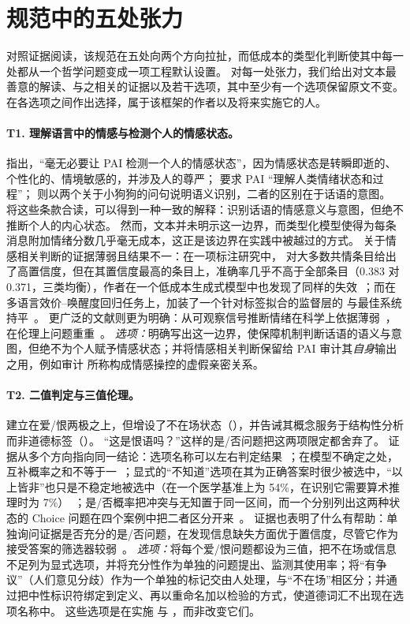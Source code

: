 \section{规范中的五处张力}
\label{sec:synthesis}

对照证据阅读，该规范在五处向两个方向拉扯，而低成本的类型化判断使其中每一处都从一个哲学问题变成一项工程默认设置。
对每一处张力，我们给出对文本最善意的解读、与之相关的证据以及若干选项，其中至少有一个选项保留原文不变。
在各选项之间作出选择，属于该框架的作者以及将来实施它的人。

\paragraph{T1. 理解语言中的情感与检测个人的情感状态。}
 指出，“毫无必要让 PAI 检测一个人的情感状态”，因为情感状态是转瞬即逝的、个性化的、情境敏感的，并涉及人的尊严； 要求 PAI “理解人类情绪状态和过程”； 则以两个关于小狗狗的问句说明语义识别，二者的区别在于话语的意图。
将这些条款合读，可以得到一种一致的解释：识别话语的情感意义与意图，但绝不推断个人的内心状态。
然而，文本并未明示这一边界，而类型化模型使得为每条消息附加情绪分数几乎毫无成本，这正是该边界在实践中被越过的方式。
关于情感相关判断的证据薄弱且结果不一：在一项标注研究中，\jev{} 对大多数共情条目给出了高置信度，但在其置信度最高的条目上，准确率几乎不高于全部条目（0.383 对 0.371，三类均衡），作者在一个低成本生成式模型中也发现了同样的失效~\cite{arx24574}；而在多语言效价--唤醒度回归任务上，加装了一个针对标签拟合的监督层的 \jev{} 与最佳系统持平~\cite{arx35293}。
更广泛的文献则更为明确：从可观察信号推断情绪在科学上依据薄弱~\cite{barrett2019emotional}，在伦理上问题重重~\cite{stark2021ethics}。
\emph{选项：}明确写出这一边界，使保障机制判断话语的语义与意图，但绝不为个人赋予情感状态；并将情感相关判断保留给 PAI 审计其\emph{自身}输出之用，例如审计  所称构成情感操控的虚假亲密关系。

\paragraph{T2. 二值判定与三值伦理。}
\pol{} 建立在爱/恨两极之上，但增设了不在场状态（），并告诫其概念服务于结构性分析而非道德标签（）。
“这是恨语吗？”这样的是/否问题把这两项限定都舍弃了。
证据从多个方向指向同一结论：选项名称可以左右判定结果~\cite{arx26758,arx00346}；在模型不确定之处，互补概率之和不等于一~\cite{arx33209}；显式的“不知道”选项在其为正确答案时很少被选中，“以上皆非”也只是不稳定地被选中（在一个医学基准上为 54\%，在识别它需要算术推理时为 7\%）~\cite{arx34024,arx39496}；是/否概率把冲突与无知置于同一区间，而一个分别列出这两种状态的 Choice 问题在四个案例中把二者区分开来~\cite{zen22848952}\zmark{}。
证据也表明了什么有帮助：单独询问证据是否充分的是/否问题，在发现信息缺失方面优于置信度，尽管它作为接受答案的筛选器较弱~\cite{arx01006}。
\emph{选项：}将每个爱/恨问题都设为三值，把不在场或信息不足列为显式选项，并将充分性作为单独的问题提出、监测其使用率；将“有争议”（人们意见分歧）作为一个单独的标记交由人处理，与“不在场”相区分；并通过把中性标识符绑定到定义、再以重命名加以检验的方式，使道德词汇不出现在选项名称中。
这些选项是在实施  与 ，而非改变它们。

